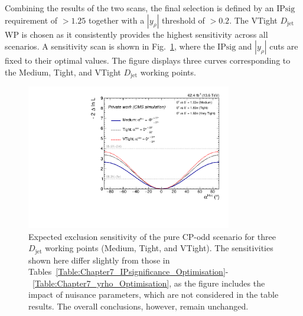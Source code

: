 Combining the results of the two scans, the final selection is defined by an IP$\text{sig}$ requirement of $>1.25$ together with a $|y_\rho|$ threshold of $>0.2$. The VTight $D_{\text{jet}}$ \ac{WP} is chosen as it consistently provides the highest sensitivity across all scenarios. A sensitivity scan is shown in Fig.~\ref{Figure:Chapter7_WP_Optimisation}, where the IP$\text{sig}$ and $|y_\rho|$ cuts are fixed to their optimal values. The figure displays three curves corresponding to the Medium, Tight, and VTight $D_{\text{jet}}$ working points. 

\begin{figure}[!htbp]
    \centering
    \includegraphics[width=0.8\textwidth]{Figures/Chapter7/alpha/alpha_WP.pdf}
    \caption[Expected sensitivity scan for different $D_{\text{jet}}$ working points.]
    {Expected exclusion sensitivity of the pure CP-odd scenario for three $D_{\text{jet}}$ working points (Medium, Tight, and VTight). The sensitivities shown here differ slightly from those in Tables~\ref{Table:Chapter7_IPsignificance_Optimisation}-~\ref{Table:Chapter7_yrho_Optimisation}, as the figure includes the impact of nuisance parameters, which are not considered in the table results. The overall conclusions, however, remain unchanged.}
    \label{Figure:Chapter7_WP_Optimisation}
\end{figure}







